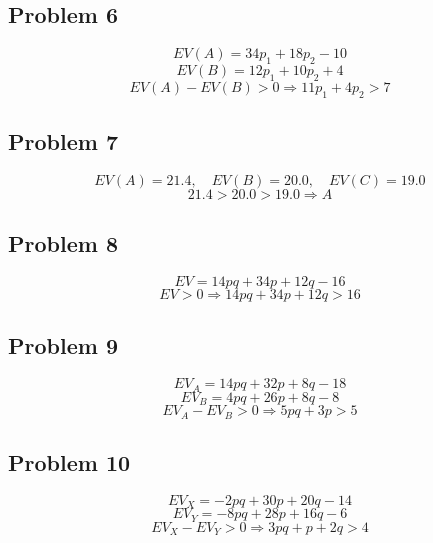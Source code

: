 \subsection*{Problem 6}
\[
EV(A)=34p_1+18p_2-10
\]
\[
EV(B)=12p_1+10p_2+4
\]
\[
EV(A)-EV(B)>0\Rightarrow 11p_1+4p_2>7
\]

\subsection*{Problem 7}
\[
EV(A)=21.4,\quad EV(B)=20.0,\quad EV(C)=19.0
\]
\[
21.4>20.0>19.0\Rightarrow A
\]

\subsection*{Problem 8}
\[
EV=14pq+34p+12q-16
\]
\[
EV>0\Rightarrow 14pq+34p+12q>16
\]

\subsection*{Problem 9}
\[
EV_A=14pq+32p+8q-18
\]
\[
EV_B=4pq+26p+8q-8
\]
\[
EV_A-EV_B>0\Rightarrow 5pq+3p>5
\]

\subsection*{Problem 10}
\[
EV_X=-2pq+30p+20q-14
\]
\[
EV_Y=-8pq+28p+16q-6
\]
\[
EV_X-EV_Y>0\Rightarrow 3pq+p+2q>4
\]


